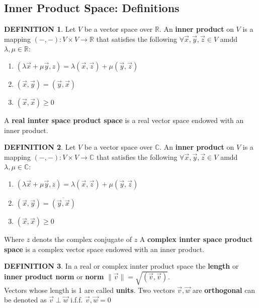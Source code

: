 \documentclass[10pt]{article}
\theoremstyle{definition}
\newtheorem{definition}{DEFINITION}[subsection]
\newcommand{\norm}[1]{\lVert #1 \rVert}
\begin{document}
\subsection{Inner Product Space: Definitions}
\begin{definition}
    Let $V$ be a vector space over $\mathbb{R}$. An \textbf{inner product} on $V$ is a mapping $(-,-): V \times V \rightarrow \mathbb{R}$ that satisfies the following $\forall \vec{x},\vec{y},\vec{z}\in V$ amdd $\lambda,\mu\in \mathbb{R}$:
    \begin{enumerate}
        \item $(\lambda\vec{x} + \mu\vec{y}, z) = \lambda(\vec{x},\vec{z}) + \mu(\vec{y},\vec{z})$
        \item $(\vec{x}, \vec{y}) = (\vec{y},\vec{x})$
        \item $(\vec{x},\vec{x}) \geq 0$
    \end{enumerate} 
    A \textbf{real innter space product space} is a real vector space endowed with an inner product.
\end{definition}

\begin{definition}
    Let $V$ be a vector space over $\mathbb{C}$. An \textbf{inner product} on $V$ is a mapping $(-,-): V \times V \rightarrow \mathbb{C}$ that satisfies the following $\forall \vec{x},\vec{y},\vec{z}\in V$ amdd $\lambda,\mu\in \mathbb{C}$:
    \begin{enumerate}
        \item $(\lambda\vec{x} + \mu\vec{y}, z) = \lambda(\vec{x},\vec{z}) + \mu(\vec{y},\vec{z})$
        \item $(\vec{x}, \vec{y}) = \overline{(\vec{y},\vec{x})}$
        \item $(\vec{x},\vec{x}) \geq 0$
    \end{enumerate} 
    Where $\overline{z}$ denots the complex conjugate of $z$ A \textbf{complex innter space product space} is a complex vector space endowed with an inner product.
\end{definition}

\begin{definition}
    In a real or complex innter product space the \textbf{length} or \textbf{inner product norm} or \textbf{norm} $\norm{\vec{v}} = \sqrt{(\vec{v},\vec{v})}$.\\
    Vectors whose length is 1 are called \textbf{units}. Two vectors $\vec{v},\vec{w}$ are \textbf{orthogonal} can be denoted as $\vec{v} \perp \vec{w}$ i.f.f. $\vec{v}, \vec{w} = 0$
\end{definition}
\end{document}
